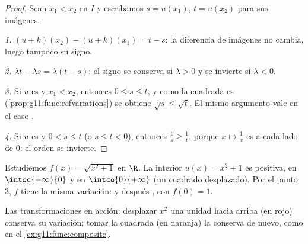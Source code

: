 \begin{proof}
Sean $x_1 < x_2$ en $I$ y escribamos $s = u(x_1)$, $t = u(x_2)$ para sus
imágenes.

\emph{1.} $(u+k)(x_2) - (u+k)(x_1) = t - s$: la diferencia de imágenes no
cambia, luego tampoco su signo.

\emph{2.} $\lambda t - \lambda s = \lambda(t - s)$: el signo se conserva
si $\lambda > 0$ y se invierte si $\lambda < 0$.

\emph{3.} Si $u$ es  y $x_1 < x_2$, entonces $0 \leq s \leq t$, y
como la  cuadrada es 
(\cref{prop:g11:func:refvariations}) se obtiene $\sqrt s \leq \sqrt t$. El
mismo argumento vale en el caso .

\emph{4.} Si $u$ es  y $0 < s \leq t$ (o $s \leq t < 0$),
entonces $\frac1s \geq \frac1t$, porque $x \mapsto \frac1x$ es 
a cada lado de $0$: el orden se invierte.
\end{proof}

\begin{example}\label{ex:g11:func:composite}
Estudiemos $f(x) = \sqrt{x^2 + 1}$ en $\R$. La  interior
$u(x) = x^2 + 1$ es positiva,  en $\intoc{-\infty}{0}$ y
 en $\intco{0}{+\infty}$ (un cuadrado desplazado). Por el punto
3, $f$ tiene la misma variación:  y después , con
 $f(0) = 1$.
\end{example}

\begin{omfigure}

{\small Las transformaciones en acción: desplazar $x^2$ una unidad hacia
arriba (en rojo) conserva su variación; tomar la  cuadrada (en
naranja) la conserva de nuevo, como en el \cref{ex:g11:func:composite}.}
\end{omfigure}

